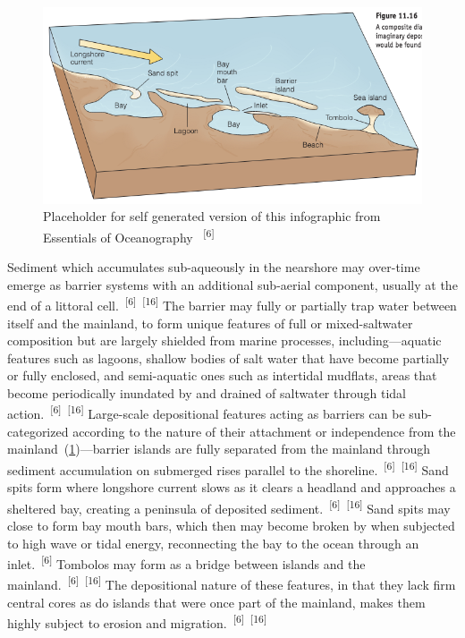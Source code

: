 \documentclass{article}
\begin{document}

\begin{figure}
    \centering
    \includegraphics[width=.9\linewidth]{images/depositional-morphology.png}
    \caption{Placeholder for self generated version of this infographic from Essentials of Oceanography ~\textsuperscript{[6]}}
    \label{figure10}
\end{figure}


\par{Sediment which accumulates sub-aqueously in the nearshore may over-time emerge as barrier systems with an additional sub-aerial component, usually at the end of a littoral cell.~\textsuperscript{[6]}~\textsuperscript{[16]} The barrier may fully or partially trap water between itself and the mainland, to form unique features of full or mixed-saltwater composition but are largely shielded from marine processes, including---aquatic features such as lagoons, shallow bodies of salt water that have become partially or fully enclosed, and semi-aquatic ones such as intertidal mudflats, areas that become periodically inundated by and drained of saltwater through tidal action.~\textsuperscript{[6]}~\textsuperscript{[16]} Large-scale depositional features acting as barriers can be sub-categorized according to the nature of their attachment or independence from the mainland~(\cref{figure10})---barrier islands are fully separated from the mainland through sediment accumulation on submerged rises parallel to the shoreline.~\textsuperscript{[6]}~\textsuperscript{[16]} Sand spits form where longshore current slows as it clears a headland and approaches a sheltered bay, creating a peninsula of deposited sediment.~\textsuperscript{[6]}~\textsuperscript{[16]} Sand spits may close to form bay mouth bars, which then may become broken by when subjected to high wave or tidal energy, reconnecting the bay to the ocean through an inlet.~\textsuperscript{[6]} Tombolos may form as a bridge between islands and the mainland.~\textsuperscript{[6]}~\textsuperscript{[16]} The depositional nature of these features, in that they lack firm central cores as do islands that were once part of the mainland, makes them highly subject to erosion and migration.~\textsuperscript{[6]}~\textsuperscript{[16]}} 
\end{document}
